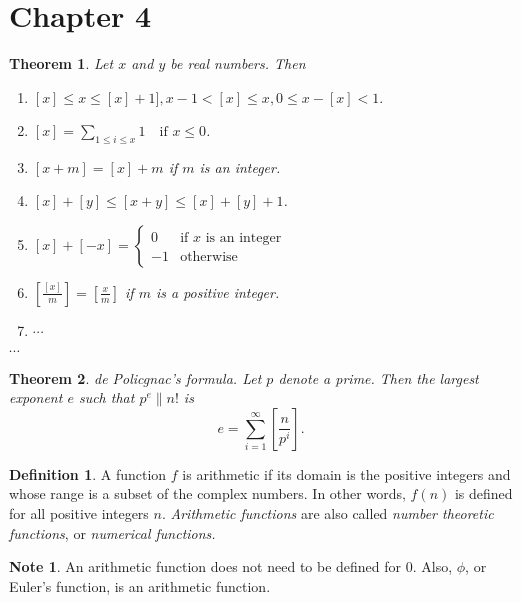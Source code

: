 \documentclass{amsart}
\newtheorem{theorem}{Theorem}
\theoremstyle{definition}
\newtheorem*{definition*}{Definition}
\newtheorem*{note*}{Note}
\begin{document}
\section*{Chapter 4}

\begin{theorem}
  Let $x$ and $y$ be real numbers.
  Then
  \begin{enumerate}[(1)]
    \item
    $[x] \leq x \leq [x] + 1], x-1 < [x] \leq x, 0 \leq x - [x] < 1.$
  \item
    $[x] = \sum_{1 \leq i \leq x} 1 \quad \text{if $x \leq 0$}$.
  \item
    $[x+m] = [x] + m$ if $m$ is an integer.
  \item
    $[x] + [y] \leq [x + y] \leq [x] + [y] + 1$.
  \item
  $[x] + [-x] = \begin{cases} 0 & \text{if $x$ is an integer} \\
                              -1 & \text{otherwise} \end{cases}$
  \item
    $\left[ \frac{[x]}{m} \right] = \left[ \frac{x}{m} \right]$
    if $m$ is a positive integer.
  \item
    $\cdots$
  \end{enumerate}
  $\cdots$
\end{theorem}

\begin{theorem}
  de Policgnac's formula.
  Let $p$ denote a prime.
  Then the largest exponent $e$ such that $p^e \parallel n!$
  is 
  \[
    e = \sum^{\infty}_{i = 1} \left[ \frac{n}{p^i} \right].
  \]
\end{theorem}

\begin{definition*}
  A function $f$ is arithmetic if its domain is the positive
  integers and whose range is a subset of the complex numbers.
  In other words, $f(n)$ is defined for all positive
  integers $n$.
  \emph{Arithmetic functions} are also called
  \emph{number theoretic functions}, or
  \emph{numerical functions.}
\end{definition*}

\begin{note*}
  An arithmetic function does not need to be defined for 0.
  Also, $\phi$, or Euler's function, is an arithmetic function.
\end{note*}
\end{document}
